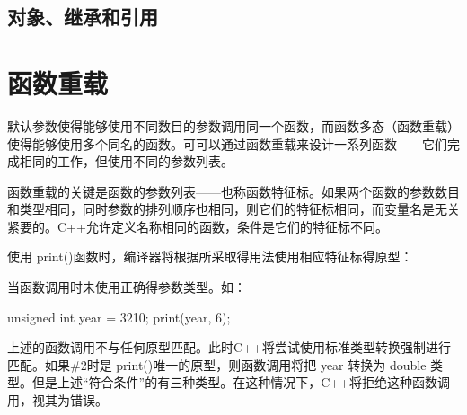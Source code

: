 \subsection{对象、继承和引用}
\section{函数重载}
默认参数使得能够使用不同数目的参数调用同一个函数，而函数多态（函数重载）使得能够使用多个同名的函数。可可以通过函数重载来设计一系列函数——它们完成相同的工作，但使用不同的参数列表。

函数重载的关键是函数的参数列表——也称函数特征标。如果两个函数的参数数目和类型相同，同时参数的排列顺序也相同，则它们的特征标相同，而变量名是无关紧要的。C++允许定义名称相同的函数，条件是它们的特征标不同。
使用 print()函数时，编译器将根据所采取得用法使用相应特征标得原型：
当函数调用时未使用正确得参数类型。如：
\begin{ccode}
unsigned int year = 3210;
print(year, 6);
\end{ccode}
上述的函数调用不与任何原型匹配。此时C++将尝试使用标准类型转换强制进行匹配。如果\#2时是 print()唯一的原型，则函数调用将把 year 转换为 double 类型。但是上述“符合条件”的有三种类型。在这种情况下，C++将拒绝这种函数调用，视其为错误。


